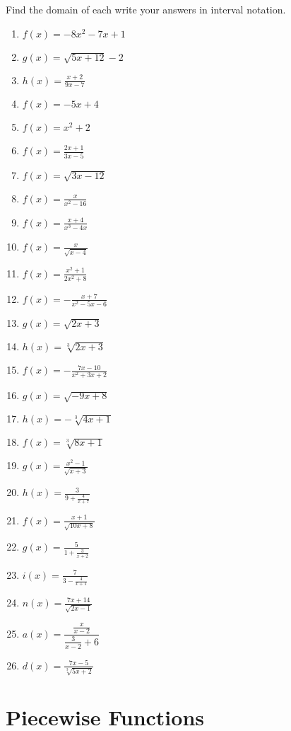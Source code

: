 Find the domain of each write your answers in interval notation.
\begin{multicols}{2}
\begin{enumerate}
	\item $f(x) = -8x^2 - 7x + 1$
	\item $g(x) = \sqrt{5x+12}-2$
	\item $h(x) = \frac{x+2}{9x-7}$
	\item $f(x) = -5x + 4$
	\item $f(x) = x^2 + 2$
	\item $f(x) = \frac{2x+1}{3x-5}$
	\item $f(x) = \sqrt{3x-12}$
	\item $f(x) = \frac{x}{x^2-16}$
	\item $f(x) = \frac{x+4}{x^3-4x}$
	\item $f(x) = \frac{x}{\sqrt{x-4}}$
	\item $f(x) = \frac{x^2+1}{2x^2+8}$
	\item $f(x) = -\frac{x+7}{x^2-5x-6}$
	\item $g(x) = \sqrt{2x+3}$
	\item $h(x) = \sqrt[3]{2x+3}$
	\item $f(x) = -\frac{7x-10}{x^2+3x+2}$
	\item $g(x) = \sqrt{-9x+8}$
	\item $h(x) = -\sqrt[3]{4x+1}$
	\item $f(x) = \sqrt[3]{8x+1}$
	\item $g(x) = \frac{x^2-1}{\sqrt{x+3}}$
	\item $h(x) = \frac{3}{9 + \frac{4}{x+7}}$
	\item $f(x) = \frac{x+1}{\sqrt{10x+8}}$
	\item $g(x) = \frac{5}{1+\frac{3}{x+2}}$
	\item $i(x) = \frac{7}{3-\frac{4}{x+1}}$
	\item $n(x) = \frac{7x+14}{\sqrt{2x-1}}$
	\item $a(x) = \dfrac{\frac{x}{x-2}}{{\frac{3}{x-2}+6}}$
	\item $d(x) = \frac{7x-5}{\sqrt[3]{5x+2}}$
\end{enumerate}
\end{multicols}

\section{Piecewise Functions}

